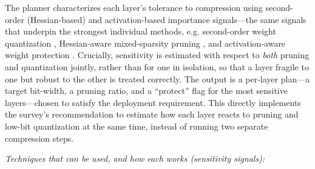 \documentclass[
11pt, %
english, %
singlespacing, %
headsepline, %
]{MastersDoctoralThesis} %
\begin{document}
The planner characterizes each layer's tolerance to compression using second-order (Hessian-based) and activation-based importance signals---the same signals that underpin the strongest individual methods, e.g. second-order weight quantization \cite{frantar2023gptq}, Hessian-aware mixed-sparsity pruning \cite{shao2024sensitivity}, and activation-aware weight protection \cite{lin2024awq}. Crucially, sensitivity is estimated with respect to \emph{both} pruning and quantization jointly, rather than for one in isolation, so that a layer fragile to one but robust to the other is treated correctly. The output is a per-layer plan---a target bit-width, a pruning ratio, and a ``protect'' flag for the most sensitive layers---chosen to satisfy the deployment requirement. This directly implements the survey's recommendation to estimate how each layer reacts to pruning and low-bit quantization at the same time, instead of running two separate compression steps.

\emph{Techniques that can be used, and how each works (sensitivity signals):}
\end{document}
